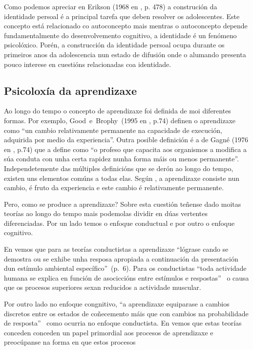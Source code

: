Como podemos apreciar en Erikson (1968 en , p. 478) a construción da identidade persoal é a principal tarefa que deben resolver os adolescentes. Este concepto está relacionado co autoconcepto mais mentras o autoconcepto depende fundamentalmente do desenvolvemento cognitivo, a identidade é un fenómeno psicolóxico. Porén, a construcción da identidade persoal ocupa durante os primeiros anos da adolescencia nun estado de difusión onde o alumando presenta pouco interese en cuestións relacionadas coa identidade.

\subsection{Psicoloxía da aprendizaxe}
Ao longo do tempo o concepto de aprendizaxe foi definida de moi diferentes formas. Por exemplo, Good~e~Brophy~(1995 en , p.74) definen o aprendizaxe como ``un cambio relativamente permanente na capacidade de execución, adquirida por medio da experiencia''. Outra posible definición é a de Gagné (1976 en , p.74) que a define como ``o profeso que capacita aos organismos a modifica a súa conduta con unha certa rapidez nunha forma máis ou menos permanente''. Independetemente das múltiples definicións que se derón ao longo do tempo, existen uns elementos comúns a todas elas. Según , a aprendizaxe consiste nun cambio, é fruto da experiencia e este cambio é relativamente permanente.

Pero, como se produce a aprendizaxe? Sobre esta cuestión teñense dado moitas teorías ao longo do tempo mais podemolas dividir en dúas vertentes diferenciadas. Por un lado temos o enfoque conductual e por outro o enfoque cognitivo.

En  vemos que para as teorías conductistas a aprendizaxe ``lógrase cando se demostra ou se exhibe unha resposa apropiada a continuación da presentación dun estímulo ambiental específico''~(p.~6). Para os conductistas ``toda actividade humana se explica en función de asociccións entre estímulos e respostas''~\cite[p.~82]{unedpsicoedu} o causa que os procesos superiores sexan reducidos a actividade muscular.

Por outro lado no enfoque congnitivo, ``a aprendizaxe equiparase a cambios discretos entre os estados de coñecemento máis que con cambios na probabilidade de resposta''~\cite[p.~9]{ertmer1993conductismo} como ocurria no enfoque conductista. En  vemos que estas teorías conceden conceden un papel primordial aos procesos de aprendizaxe e preocúpanse na forma en que estos procesos

